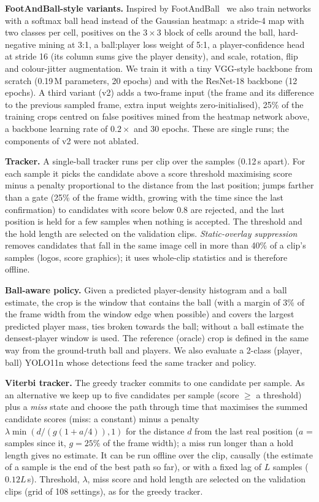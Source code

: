 \documentclass[conference]{IEEEtran}
\begin{document}
\textbf{FootAndBall-style variants.} Inspired by FootAndBall~\cite{komorowski2020} we also train networks with a softmax ball head instead of the Gaussian heatmap: a stride-4 map with two classes per cell, positives on the $3{\times}3$ block of cells around the ball, hard-negative mining at 3:1, a ball:player loss weight of 5:1, a player-confidence head at stride 16 (its column sums give the player density), and scale, rotation, flip and colour-jitter augmentation. We train it with a tiny VGG-style backbone from scratch (0.19\,M parameters, 20 epochs) and with the ResNet-18 backbone (12 epochs). A third variant (v2) adds a two-frame input (the frame and its difference to the previous sampled frame, extra input weights zero-initialised), 25\% of the training crops centred on false positives mined from the heatmap network above, a backbone learning rate of $0.2\times$ and 30 epochs. These are single runs; the components of v2 were not ablated.

\textbf{Tracker.} A single-ball tracker runs per clip over the samples (0.12\,s apart). For each sample it picks the candidate above a score threshold maximising score minus a penalty proportional to the distance from the last position; jumps farther than a gate (25\% of the frame width, growing with the time since the last confirmation) to candidates with score below 0.8 are rejected, and the last position is held for a few samples when nothing is accepted. The threshold and the hold length are selected on the validation clips. \emph{Static-overlay suppression} removes candidates that fall in the same image cell in more than 40\% of a clip's samples (logos, score graphics); it uses whole-clip statistics and is therefore offline.

\textbf{Ball-aware policy.} Given a predicted player-density histogram and a ball estimate, the crop is the window that contains the ball (with a margin of $3\%$ of the frame width from the window edge when possible) and covers the largest predicted player mass, ties broken towards the ball; without a ball estimate the densest-player window is used. The reference (oracle) crop is defined in the same way from the ground-truth ball and players. We also evaluate a 2-class (player, ball) YOLO11n whose detections feed the same tracker and policy.

\textbf{Viterbi tracker.} The greedy tracker commits to one candidate per sample. As an alternative we keep up to five candidates per sample (score $\ge$ a threshold) plus a \emph{miss} state and choose the path through time that maximises the summed candidate scores (miss: a constant) minus a penalty $\lambda\min(d/(g(1+a/4)),1)$ for the distance $d$ from the last real position ($a$ = samples since it, $g=25\%$ of the frame width); a miss run longer than a hold length gives no estimate. It can be run offline over the clip, causally (the estimate of a sample is the end of the best path so far), or with a fixed lag of $L$ samples ($0.12L$\,s). Threshold, $\lambda$, miss score and hold length are selected on the validation clips (grid of 108 settings), as for the greedy tracker.
\end{document}
